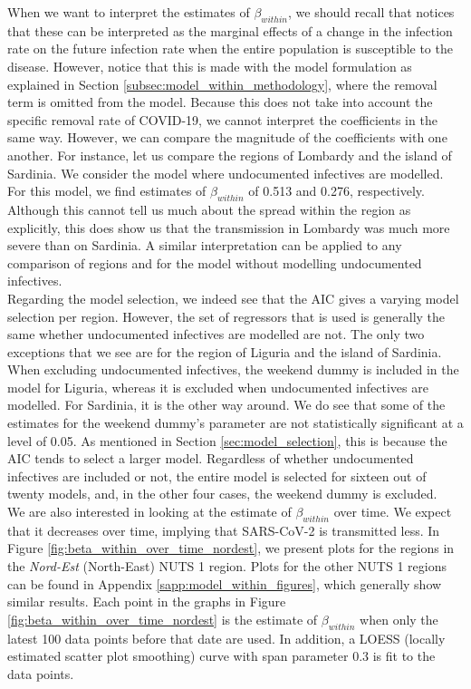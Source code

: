 \documentclass[12pt]{article}
\begin{document}
    When we want to interpret the estimates of $\beta_{within}$, we should recall that \textcite{adda2016economic} notices that these can be interpreted as the marginal effects of a change in the infection rate on the future infection rate when the entire population is susceptible to the disease. However, notice that this is made with the model formulation as explained in Section \ref{subsec:model_within_methodology}, where the removal term is omitted from the model. Because this does not take into account the specific removal rate of COVID-19, we cannot interpret the coefficients in the same way. However, we can compare the magnitude of the coefficients with one another. For instance, let us compare the regions of Lombardy and the island of Sardinia. We consider the model where undocumented infectives are modelled. For this model, we find estimates of $\beta_{within}$ of 0.513 and 0.276, respectively. Although this cannot tell us much about the spread within the region as explicitly, this does show us that the transmission in Lombardy was much more severe than on Sardinia. A similar interpretation can be applied to any comparison of regions and for the model without modelling undocumented infectives. \\

    Regarding the model selection, we indeed see that the AIC gives a varying model selection per region. However, the set of regressors that is used is generally the same whether undocumented infectives are modelled are not. The only two exceptions that we see are for the region of Liguria and the island of Sardinia. When excluding undocumented infectives, the weekend dummy is included in the model for Liguria, whereas it is excluded when undocumented infectives are modelled. For Sardinia, it is the other way around. We do see that some of the estimates for the weekend dummy's parameter are not statistically significant at a level of 0.05. As mentioned in Section \ref{sec:model_selection}, this is because the AIC tends to select a larger model. Regardless of whether undocumented infectives are included or not, the entire model is selected for sixteen out of twenty models, and, in the other four cases, the weekend dummy is excluded. \\
	
	We are also interested in looking at the estimate of $\beta_{within}$ over time. We expect that it decreases over time, implying that SARS-CoV-2 is transmitted less. In Figure \ref{fig:beta_within_over_time_nordest}, we present plots for the regions in the \textit{Nord-Est} (North-East) NUTS 1 region. Plots for the other NUTS 1 regions can be found in Appendix \ref{sapp:model_within_figures}, which generally show similar results. Each point in the graphs in Figure \ref{fig:beta_within_over_time_nordest} is the estimate of $\beta_{within}$ when only the latest 100 data points before that date are used. In addition, a LOESS (locally estimated scatter plot smoothing) curve with span parameter 0.3 is fit to the data points. \\
	
\end{document}

